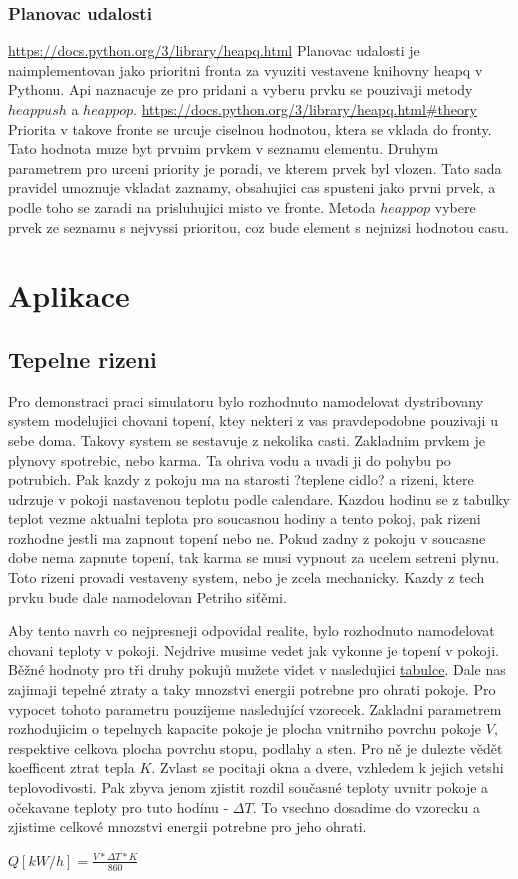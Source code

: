 \subsection{Planovac udalosti}
\url{https://docs.python.org/3/library/heapq.html}
Planovac udalosti je naimplementovan jako prioritni fronta za vyuziti vestavene knihovny heapq v Pythonu. Api naznacuje ze pro pridani a vyberu prvku se pouzivaji metody $heappush$ a $heappop$. \url{https://docs.python.org/3/library/heapq.html#theory} Priorita v takove fronte se urcuje ciselnou hodnotou, ktera se vklada do fronty. Tato hodnota muze byt prvnim prvkem v seznamu elementu. Druhym parametrem pro urceni priority je poradi, ve kterem prvek byl vlozen. Tato sada pravidel umoznuje vkladat zaznamy, obsahujici cas spusteni jako prvni prvek, a podle toho se zaradi na prisluhujici misto ve fronte. Metoda $heappop$ vybere prvek ze seznamu s nejvyssi prioritou, coz bude element s nejnizsi hodnotou casu.
\chapter{Aplikace}
\section{Tepelne rizeni}
Pro demonstraci praci simulatoru bylo rozhodnuto namodelovat dystribovany system modelujici chovani topení, ktey nekteri z vas pravdepodobne pouzivaji u sebe doma. Takovy system se sestavuje z nekolika casti. Zakladnim prvkem je plynovy spotrebic, nebo karma. Ta ohriva vodu a uvadi ji do pohybu po potrubich. Pak kazdy z pokoju ma na starosti ?teplene cidlo? a rizeni, ktere udrzuje v pokoji nastavenou teplotu podle calendare. Kazdou hodinu se z tabulky teplot vezme aktualni teplota pro soucasnou hodiny a tento pokoj, pak rizeni rozhodne jestli ma zapnout topení nebo ne. Pokud zadny z pokoju v soucasne dobe nema zapnute topení, tak karma se musi vypnout za ucelem setreni plynu. Toto rizeni provadi vestaveny system, nebo je zcela mechanicky. Kazdy z tech prvku bude dale namodelovan Petriho siťěmi.

Aby tento navrh co nejpresneji odpovidal realite, bylo rozhodnuto namodelovat chovani teploty v pokoji.
Nejdrive musime vedet jak vykonne je topení v pokoji. Běžné hodnoty pro tři druhy pokujů mužete videt v nasledujici \hyperref[tab:TepelneZtraty]{tabulce}. Dale nas zajimaji tepelné ztraty a taky mnozstvi energii potrebne pro ohrati pokoje. Pro vypocet tohoto parametru pouzijeme nasledující vzorecek. Zakladni parametrem rozhodujicim o tepelnych kapacite pokoje je plocha vnitrniho povrchu pokoje $V$, respektive celkova plocha povrchu stopu, podlahy a sten. Pro ně je dulezte vědět koefficent ztrat tepla $K$. Zvlast se pocitaji okna a dvere, vzhledem k jejich vetshi teplovodivosti. Pak zbyva jenom zjistit rozdil současné teploty uvnitr pokoje a očekavane teploty pro tuto hodínu - $\Delta{T}$. To vsechno dosadime do vzorecku a zjistime celkové mnozstvi energii potrebne pro jeho ohrati. \cite{tep_calc}
\begin{center}
  $Q[kW/h] = \frac{V*\Delta{T}*K}{860}$
\end{center}

